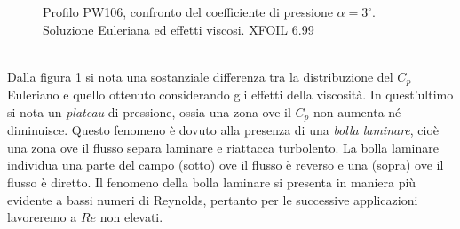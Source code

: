\begin{figure} [H]
\centering
{}
\caption{\footnotesize Profilo PW106, confronto del coefficiente di pressione $ \alpha=3^\circ$. Soluzione Euleriana ed effetti viscosi. XFOIL 6.99}\label{fig:cpre}
\end{figure}
\noindent  \\

Dalla figura \ref{fig:cpre} si nota una sostanziale differenza tra la distribuzione del $C_p$ Euleriano e quello ottenuto considerando gli effetti della viscosità. In quest'ultimo si nota un {\itshape plateau} di pressione, ossia una zona ove il $C_p$ non aumenta né diminuisce. Questo fenomeno è dovuto alla presenza di una {\itshape bolla laminare}, cioè una zona ove il flusso separa laminare e riattacca turbolento. La bolla laminare individua una parte del campo (sotto) ove il flusso è reverso e una (sopra) ove il flusso è diretto. Il fenomeno della bolla laminare si presenta in maniera più evidente a bassi numeri di Reynolds, pertanto per le successive applicazioni lavoreremo a $Re$ non elevati.

